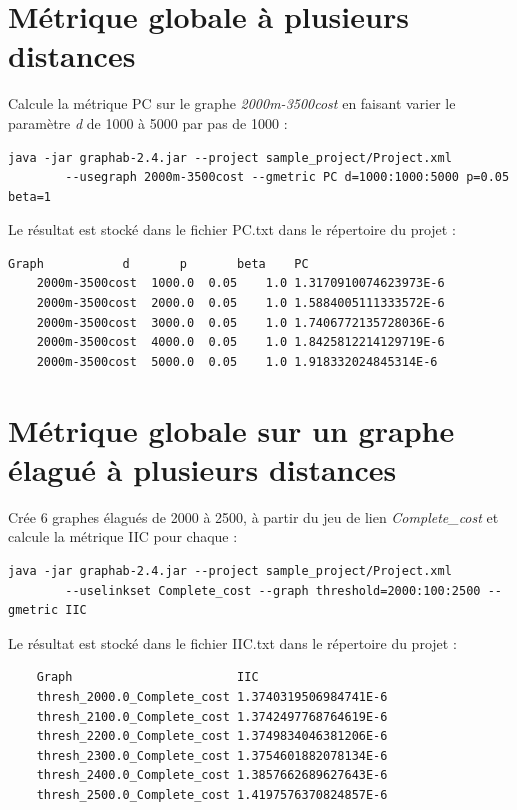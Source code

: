 \documentclass[a4paper,10pt]{report}
\begin{document}
\section{Métrique globale à plusieurs distances}
Calcule la métrique PC sur le graphe \textit{2000m-3500cost} en faisant varier le paramètre \textit{d} de 1000 à 5000 par pas de 1000 :
\begin{Verbatim}[tabsize=4]
	java -jar graphab-2.4.jar --project sample_project/Project.xml
		--usegraph 2000m-3500cost --gmetric PC d=1000:1000:5000 p=0.05 beta=1
\end{Verbatim}
Le résultat est stocké dans le fichier PC.txt dans le répertoire du projet :
\begin{Verbatim}[tabsize=4]
	Graph         	d     	p   	beta	PC
	2000m-3500cost	1000.0	0.05	1.0	1.3170910074623973E-6
	2000m-3500cost	2000.0	0.05	1.0	1.5884005111333572E-6
	2000m-3500cost	3000.0	0.05	1.0	1.7406772135728036E-6
	2000m-3500cost	4000.0	0.05	1.0	1.8425812214129719E-6
	2000m-3500cost	5000.0	0.05	1.0	1.918332024845314E-6
\end{Verbatim}

\section{Métrique globale sur un graphe élagué à plusieurs distances}
Crée 6 graphes élagués de 2000 à 2500, à partir du jeu de lien \textit{Complete\_cost} et calcule la métrique IIC pour chaque :
\begin{Verbatim}[tabsize=4]
	java -jar graphab-2.4.jar --project sample_project/Project.xml
		--uselinkset Complete_cost --graph threshold=2000:100:2500 --gmetric IIC
\end{Verbatim}
Le résultat est stocké dans le fichier IIC.txt dans le répertoire du projet :
\begin{Verbatim}
	Graph                      	IIC
	thresh_2000.0_Complete_cost	1.3740319506984741E-6
	thresh_2100.0_Complete_cost	1.3742497768764619E-6
	thresh_2200.0_Complete_cost	1.3749834046381206E-6
	thresh_2300.0_Complete_cost	1.3754601882078134E-6
	thresh_2400.0_Complete_cost	1.3857662689627643E-6
	thresh_2500.0_Complete_cost	1.4197576370824857E-6
\end{Verbatim}
\end{document}
